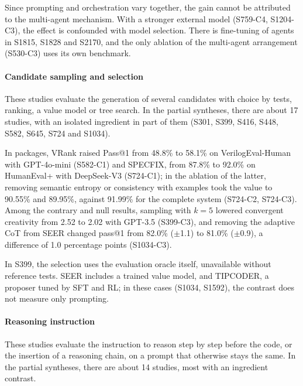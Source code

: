 Since prompting and orchestration vary together, the gain cannot be attributed to the multi-agent mechanism. With a stronger external model (S759-C4, S1204-C3), the effect is confounded with model selection. There is fine-tuning of agents in S1815, S1828 and S2170, and the only ablation of the multi-agent arrangement (S530-C3) uses its own benchmark.

\paragraph{Candidate sampling and selection}
These studies evaluate the generation of several candidates with choice by tests, ranking, a value model or tree search. In the partial syntheses, there are about 17 studies, with an isolated ingredient in part of them (S301, S399, S416, S448, S582, S645, S724 and S1034).

In packages, VRank raised Pass@1 from 48.8\% to 58.1\% on VerilogEval-Human with GPT-4o-mini (S582-C1) and SPECFIX, from 87.8\% to 92.0\% on HumanEval+ with DeepSeek-V3 (S724-C1); in the ablation of the latter, removing semantic entropy or consistency with examples took the value to 90.55\% and 89.95\%, against 91.99\% for the complete system (S724-C2, S724-C3).
Among the contrary and null results, sampling with $k = 5$ lowered convergent creativity from 2.52 to 2.02 with GPT-3.5 (S399-C3), and removing the adaptive CoT from SEER changed pass@1 from 82.0\% ($\pm$1.1) to 81.0\% ($\pm$0.9), a difference of 1.0 percentage points (S1034-C3).

In S399, the selection uses the evaluation oracle itself, unavailable without reference tests. SEER includes a trained value model, and TIPCODER, a proposer tuned by SFT and RL; in these cases (S1034, S1592), the contrast does not measure only prompting.

\paragraph{Reasoning instruction}
These studies evaluate the instruction to reason step by step before the code, or the insertion of a reasoning chain, on a prompt that otherwise stays the same. In the partial syntheses, there are about 14 studies, most with an ingredient contrast.

